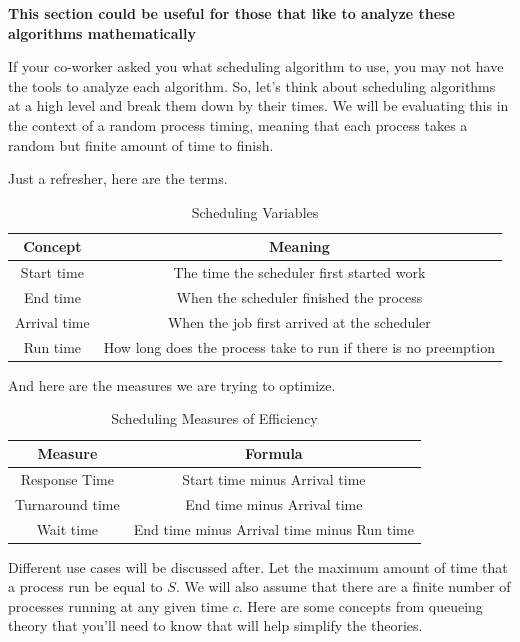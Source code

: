 \textbf{This section could be useful for those that like to analyze these algorithms mathematically}

If your co-worker asked you what scheduling algorithm to use, you may not have the tools to analyze each algorithm.
So, let's think about scheduling algorithms at a high level and break them down by their times.
We will be evaluating this in the context of a random process timing, meaning that each process takes a random but finite amount of time to finish.

Just a refresher, here are the terms.

\begin{center}
\begin{table}[h]
\caption{Scheduling Variables}
\begin{tabular}{|c|c|}
  Concept & Meaning \\ \hline
  Start time & The time the scheduler first started work \\
  End time & When the scheduler finished the process \\
  Arrival time & When the job first arrived at the scheduler \\
  Run time & How long does the process take to run if there is no preemption
\end{tabular}
\end{table}
\end{center}

And here are the measures we are trying to optimize.

\begin{center}
\begin{table}[h]
\caption{Scheduling Measures of Efficiency}
\begin{tabular}{|c|c|}
  Measure & Formula \\ \hline
  Response Time & Start time minus Arrival time\\
  Turnaround time & End time minus Arrival time\\
  Wait time & End time minus Arrival time minus Run time \\
\end{tabular}
\end{table}
\end{center}

Different use cases will be discussed after.
Let the maximum amount of time that a process run be equal to $S$.
We will also assume that there are a finite number of processes running at any given time $c$.
Here are some concepts from queueing theory that you'll need to know that will help simplify the theories.

